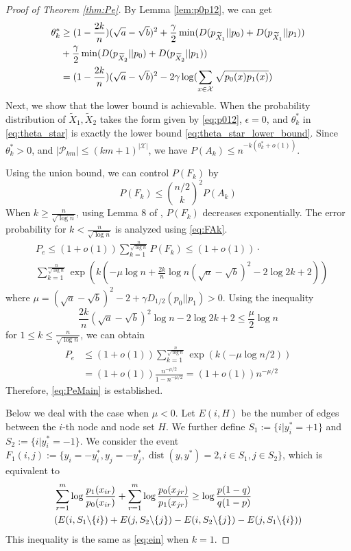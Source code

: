 \documentclass[conference]{IEEEtran}
\DeclareMathOperator{\dist}{dist}
\begin{document}
\begin{proof}[Proof of Theorem \ref{thm:Pe}]
By Lemma \ref{lem:p0p12}, we can get
\begin{align}
\theta^*_k &\geq (1-\frac{2k}{n})(\sqrt{a} - \sqrt{b})^2
+ \frac{ \gamma}{2}\min (D(p_{\widetilde{X}_1}||p_0) + D(p_{\widetilde{X}_1}||p_1)) \notag \\
&+ \frac{ \gamma}{2}\min (D(p_{\widetilde{X}_2}||p_0) + D(p_{\widetilde{X}_2}||p_1))\notag \\
&=  (1-\frac{2k}{n})(\sqrt{a} - \sqrt{b})^2 - 2 \gamma\log(\sum_{x\in\mathcal{X}}\sqrt{p_0(x)p_1(x)}) 
\label{eq:theta_star_lower_bound}
\end{align}
Next, we show that the lower bound is achievable.
When the probability distribution of $\widetilde{X}_1, \widetilde{X}_2$ takes the form given by \eqref{eq:p012},
$\epsilon = 0$, and $\theta^*_k$ in \eqref{eq:theta_star} is exactly the lower bound \eqref{eq:theta_star_lower_bound}.
Since $\theta^*_k>0$,
and $|\mathcal{P}_{km}|\leq (km+1)^{|\mathcal{X}|} $, we have $P(A_k) \leq n^{-k(\theta^*_k+o(1))}$.

Using the union bound, we can control $P(F_k)$ by
$$
P(F_k) \leq \binom{n/2}{k}^2 P(A_k)
$$
When $k \geq \frac{n}{\sqrt{\log n}}$, using Lemma 8 of \cite{feng2021},
$P(F_k)$ decreases exponentially. The error probability for $k < \frac{n}{\sqrt{\log n}}$
is analyzed using \eqref{eq:FAk}.
\begin{align*}
&P_e \leq (1+o(1))\sum_{k=1}^{\frac{n}{\sqrt{\log n}}} P(F_k) \leq (1+o(1)) \cdot \\
&\sum_{k=1}^{\frac{n}{\sqrt{\log n}}} \exp(k(-\mu \log n + \frac{2k}{n} \log n(\sqrt{a} - \sqrt{b})^2 - 2\log 2k + 2))
\end{align*}
where $\mu = (\sqrt{a} - \sqrt{b})^2-2 + \gamma D_{1/2}(p_0||p_1) > 0$.
Using the inequality
$$
\frac{2k}{n}(\sqrt{a} - \sqrt{b})^2\log n -2\log2k+2\leq \frac{\mu}{2} \log n
$$
for $1\leq k \leq \frac{n}{\sqrt{\log n}}$, we can obtain
\begin{align*}
P_e &\leq(1+o(1)) \sum_{k=1}^{\frac{n}{\sqrt{\log n}}} \exp(k(-\mu \log n/2)) \\
& =(1+o(1)) \frac{n^{-\mu / 2}}{1-n^{-\mu / 2}} = (1+o(1))n^{-\mu / 2}
\end{align*}
Therefore, \eqref{eq:PeMain} is established.

Below we deal with the case when $\mu < 0$.
Let $E(i, H)$ be the number of edges between the $i$-th node and node set $H$.
We further define $S_1:=\{i | y^*_i = +1 \}$
and $S_2:=\{i | y^*_i = -1 \}$. 
We consider the event $F_1(i,j):=\{y_i = -y^*_i, y_j = -y^*_j, \dist(y, y^*)=2, i \in S_1, j \in S_2 \}$,
which is equivalent to
\begin{align}
&\sum_{r=1}^{m} \log \frac{p_1(x_{ir})}{p_0(x_{ir})}
+\sum_{r=1}^{m} \log \frac{p_0(x_{jr})}{p_1(x_{jr})}
\geq\log \frac{p(1-q)}{q(1-p)} \notag\\
& (E(i, S_1 \backslash \{i\}) + E(j, S_2 \backslash \{j\})
- E(i, S_2 \backslash \{j\}) - E(j, S_1 \backslash \{i\})) \label{eq:F1ij}
\end{align}
This inequality is the same as \eqref{eq:ein} when $k=1$.


\end{proof}
\end{document}
